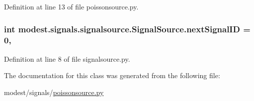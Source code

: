 Definition at line 13 of file poissonsource.\+py.

\subsubsection[{\texorpdfstring{next\+Signal\+ID}{nextSignalID}}]{\setlength{\rightskip}{0pt plus 5cm}int modest.\+signals.\+signalsource.\+Signal\+Source.\+next\+Signal\+ID = 0\hspace{0.3cm}{\ttfamily [static]}, {\ttfamily [inherited]}}\hypertarget{classmodest_1_1signals_1_1signalsource_1_1SignalSource_a453eafb550b551adbec0903deb63dfce}{}\label{classmodest_1_1signals_1_1signalsource_1_1SignalSource_a453eafb550b551adbec0903deb63dfce}


Definition at line 8 of file signalsource.\+py.



The documentation for this class was generated from the following file\+:\begin{DoxyCompactItemize}
\item 
modest/signals/\hyperlink{poissonsource_8py}{poissonsource.\+py}\end{DoxyCompactItemize}
